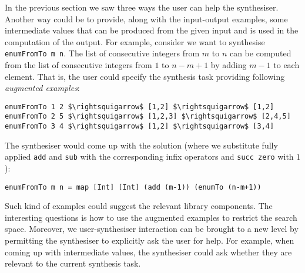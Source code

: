 In the previous section we saw three ways the user can help the synthesiser. Another way could be to provide, along with the input-output examples, some intermediate values that can be produced from the given input and is used in the computation of the output.
For example, consider we want to synthesise \lstinline!enumFromTo m n!. The list of consecutive integers from $m$ to $n$ can be computed from the list of consecutive integers from $1$ to $n-m+1$ by adding $m-1$ to each element. That is, the user could specify the synthesis task providing following \emph{augmented examples}:
\begin{lstlisting}[style=plain]
enumFromTo 1 2 $\rightsquigarrow$ [1,2] $\rightsquigarrow$ [1,2]
enumFromTo 2 5 $\rightsquigarrow$ [1,2,3] $\rightsquigarrow$ [2,4,5]
enumFromTo 3 4 $\rightsquigarrow$ [1,2] $\rightsquigarrow$ [3,4]
\end{lstlisting}
The synthesiser would come up with the solution (where we substitute fully applied \lstinline!add! and \lstinline!sub! with the corresponding infix operators and \lstinline!succ zero! with $1$):
\begin{lstlisting}[style=plain]
enumFromTo m n = map [Int] [Int] (add (m-1)) (enumTo (n-m+1))
\end{lstlisting}
Such kind of examples could suggest the relevant library components. The interesting questions is how to use the augmented examples to restrict the search space.
Moreover, we user-synthesiser interaction can be brought to a new level by permitting the synthesiser to explicitly ask the user for help. For example, when coming up with intermediate values, the synthesiser could ask whether they are relevant to the current synthesis task.

